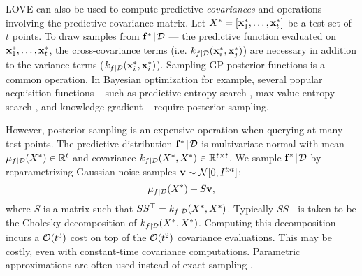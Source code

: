 LOVE{} can also be used to compute predictive \emph{covariances} and operations involving the predictive covariance matrix.
Let $X^* = [\mathbf{x}^*_1, \ldots, \mathbf{x}^*_t]$ be a test set of $t$ points.
To draw samples from $\mathbf{f}^* \! \mid \! \mathcal D$ --- the predictive function evaluated on $\mathbf{x}^*_1, \ldots, \mathbf{x}^*_t$, the cross-covariance terms (i.e. $k_{f \mid \mathcal D} (\mathbf{x}^*_i, \mathbf{x}^*_j)$) are necessary in addition to the variance terms ($k_{f \mid \mathcal D} (\mathbf{x}^*_i, \mathbf{x}^*_i)$).
Sampling GP posterior functions is a common operation.
In Bayesian optimization for example, several popular acquisition functions -- such as predictive entropy search \cite{hernandez2014predictive}, max-value entropy search \cite{wang2017max}, and knowledge gradient \cite{frazier2009knowledge} -- require posterior sampling.

However, posterior sampling is an expensive operation when querying at many test points.
The predictive distribution $\mathbf{f}^* \! \mid \! \mathcal D$ is multivariate normal with mean $\mu_{f \mid \mathcal D} (X^*) \in \mathbb{R}^t$ and covariance $k_{f \mid \mathcal D} (X^*, X^*) \in \mathbb{R}^{t \times t}$.
We sample $\mathbf{f}^* \! \mid \! \mathcal D$ by reparametrizing Gaussian noise samples $\mathbf{v} \sim \normaldist{0}{\bI{}^{t\!\times \!t}}$:
%
\begin{equation}
  \mu_{f \mid \mathcal D} (X^*) + S \mathbf{v},
  \label{eq:sample}
\end{equation}
%
where $S$ is a matrix such that $S S^\top = k_{f \mid \mathcal D} (X^*, X^*)$.
Typically $S S^\top$ is taken to be the Cholesky decomposition of $k_{f \mid \mathcal D} (X^*, X^*)$.
Computing this decomposition incurs a $\bigo{t^3}$ cost on top of the $\bigo{t^2}$ covariance evaluations.
This may be costly, even with constant-time covariance computations.
Parametric approximations are often used instead of exact sampling \cite{deisenroth2011pilco}.

